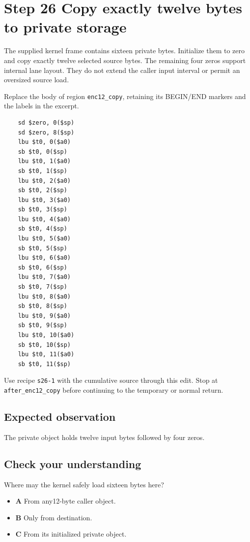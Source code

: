 \section{Step 26 Copy exactly twelve bytes to private storage}\label{base64-s26}

The supplied kernel frame contains sixteen private bytes. Initialize them to zero and copy exactly twelve selected source bytes. The remaining four zeros support internal lane layout. They do not extend the caller input interval or permit an oversized source load.

Replace the body of region \texttt{enc12\_copy}, retaining its BEGIN/END markers and the labels in the excerpt.

\begin{verbatim}
    sd $zero, 0($sp)
    sd $zero, 8($sp)
    lbu $t0, 0($a0)
    sb $t0, 0($sp)
    lbu $t0, 1($a0)
    sb $t0, 1($sp)
    lbu $t0, 2($a0)
    sb $t0, 2($sp)
    lbu $t0, 3($a0)
    sb $t0, 3($sp)
    lbu $t0, 4($a0)
    sb $t0, 4($sp)
    lbu $t0, 5($a0)
    sb $t0, 5($sp)
    lbu $t0, 6($a0)
    sb $t0, 6($sp)
    lbu $t0, 7($a0)
    sb $t0, 7($sp)
    lbu $t0, 8($a0)
    sb $t0, 8($sp)
    lbu $t0, 9($a0)
    sb $t0, 9($sp)
    lbu $t0, 10($a0)
    sb $t0, 10($sp)
    lbu $t0, 11($a0)
    sb $t0, 11($sp)
\end{verbatim}

Use recipe \texttt{s26-1} with the cumulative source through this edit. Stop at \texttt{after\_enc12\_copy} before continuing to the temporary or normal return.

\subsection{Expected observation}
The private object holds twelve input bytes followed by four zeros.

\subsection{Check your understanding}
Where may the kernel safely load sixteen bytes here?

\begin{itemize}
  \item \textbf{A} From any12-byte caller object.
  \item \textbf{B} Only from destination.
  \item \textbf{C} From its initialized private object.
\end{itemize}
